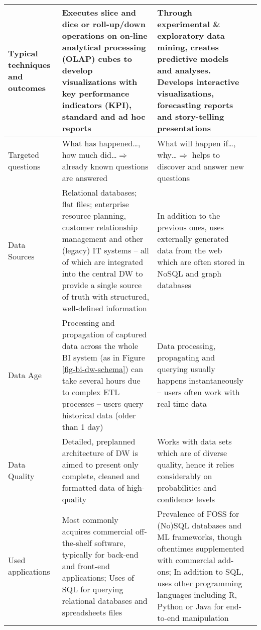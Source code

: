 \begin{spacing}{1.0}
\begin{landscape}
\begin{longtable}{|C{2.5cm}|L{8cm}| L{8cm}|L{4cm}|}
    Typical techniques and outcomes & Executes slice and dice or roll-up/down operations on on-line analytical processing (\ac{OLAP}) cubes to develop visualizations with key performance indicators (\ac{KPI}), standard and ad hoc reports & Through experimental \& exploratory data mining, creates predictive models and analyses. 
    Develops interactive visualizations, forecasting reports and story-telling presentations & \textcites{DavidDietrich2014BuildingTeams} \\ \hline
    Targeted questions & What has happened\dots, how much did\dots \newline $\Rightarrow$ already known questions are answered & What will happen if\dots, why\dots \newline $\Rightarrow$ helps to discover and answer new questions & \textcites{MikeMerritt-Holmes201610Intelligence}{DavidDietrich2014BuildingTeams} \\ \hline
    Data Sources & Relational databases; flat files; enterprise resource planning, customer relationship management and other (legacy) \ac{IT} systems -- all of which are integrated into the central \ac{DW} to provide a single source of truth with structured, well-defined information & In addition to the previous ones, uses externally generated data from the web which are often stored in NoSQL and graph databases & \textcites{DavidDietrich2014BuildingTeams}{DavidSmith2013StatisticsBI} \\ \hline
    Data Age & Processing and propagation of captured data across the whole \ac{BI} system (as in Figure \ref{fig-bi-dw-schema}) can take several hours due to complex \ac{ETL} processes -- users query historical data (older than 1 day) & Data processing, propagating and querying usually happens instantaneously -- users often work with real time data & \textcites{Larson2016AScience} \\ \hline
    Data Quality & Detailed, preplanned architecture of \ac{DW} is aimed to present only complete, cleaned and formatted data of high-quality & Works with data sets which are of diverse quality, hence it relies considerably on probabilities and confidence levels & \textcites{MikeMerritt-Holmes201610Intelligence}{DavidSmith2011HowIntelligence} \\ \hline
    Used applications & Most commonly acquires commercial off-the-shelf software, typically for back-end and front-end applications; \newline Uses of \ac{SQL} for querying relational databases and spreadsheets files & Prevalence of \ac{FOSS} for (No)SQL databases and \ac{ML} frameworks, though oftentimes supplemented with commercial add-ons; \newline In addition to \ac{SQL}, uses other programming languages including R, Python or Java for end-to-end manipulation & \textcites{DavidRostcheck2016DataCareer}{DavidSmith2011HowIntelligence}{Fern2016} \\ \hline

\end{longtable}
\end{landscape}
\end{spacing}
